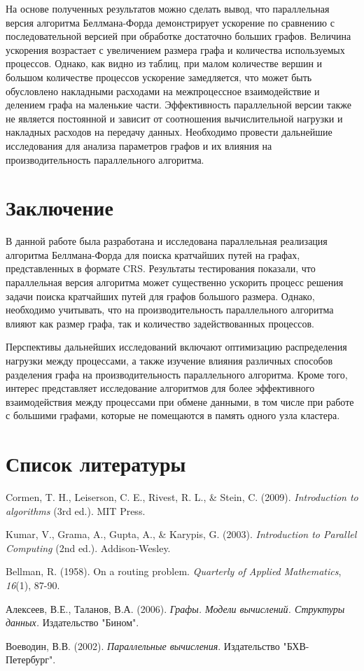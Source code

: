 \documentclass[a4paper, 14pt]{article}
\begin{document}
\indent На основе полученных результатов можно сделать вывод, что параллельная версия алгоритма Беллмана-Форда демонстрирует ускорение по сравнению с последовательной версией при обработке достаточно больших графов. Величина ускорения возрастает с увеличением размера графа и количества используемых процессов. Однако, как видно из таблиц, при малом количестве вершин и большом количестве процессов ускорение замедляется, что может быть обусловлено накладными расходами на межпроцессное взаимодействие и делением графа на маленькие части. Эффективность параллельной версии также не является постоянной и зависит от соотношения вычислительной нагрузки и накладных расходов на передачу данных.  Необходимо провести дальнейшие исследования для анализа параметров графов и их влияния на производительность параллельного алгоритма.

    \section*{\centering Заключение}
\indent В данной работе была разработана и исследована параллельная реализация алгоритма Беллмана-Форда для поиска кратчайших путей на графах, представленных в формате CRS. Результаты тестирования показали, что параллельная версия алгоритма может существенно ускорить процесс решения задачи поиска кратчайших путей для графов большого размера.  Однако, необходимо учитывать, что на производительность параллельного алгоритма влияют как размер графа, так и количество задействованных процессов.
\par  Перспективы дальнейших исследований включают оптимизацию распределения нагрузки между процессами, а также изучение влияния различных способов разделения графа на производительность параллельного алгоритма. Кроме того,  интерес представляет исследование алгоритмов для более эффективного взаимодействия между процессами при обмене данными, в том числе при работе с большими графами, которые не помещаются в память одного узла кластера.

	\newpage
	\section*{\centering Список литературы}
	\begin{enumerate}[label={[\arabic*]}]
    \item Cormen, T. H., Leiserson, C. E., Rivest, R. L., \& Stein, C. (2009). \textit{Introduction to algorithms} (3rd ed.). MIT Press. 
     \item Kumar, V., Grama, A., Gupta, A., \& Karypis, G. (2003). \textit{Introduction to Parallel Computing} (2nd ed.). Addison-Wesley.
    \item  Bellman, R. (1958). On a routing problem. \textit{Quarterly of Applied Mathematics}, \textit{16}(1), 87-90.
    \item  Алексеев, В.Е., Таланов, В.А. (2006). \textit{Графы. Модели вычислений. Структуры данных.}  Издательство "Бином".
     \item  Воеводин, В.В. (2002). \textit{Параллельные вычисления}. Издательство "БХВ-Петербург".
\end{enumerate}
		
\end{document}
